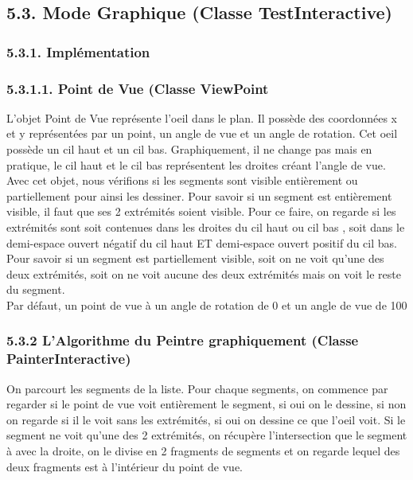 \documentclass[a4paper,12pt]{report}	%
\begin{document}
	{\subsection*{5.3. Mode Graphique (Classe TestInteractive)}}
	
    {\subsubsection*{5.3.1. Implémentation}}
	
	{\subsubsection*{5.3.1.1. Point de Vue (Classe ViewPoint}}
	L'objet Point de Vue représente l'oeil dans le plan. Il possède des coordonnées x et y représentées par un point, un angle de vue et un angle de rotation. Cet oeil possède un cil haut et un cil bas. Graphiquement, il ne change pas mais en pratique, le cil haut et le cil bas représentent les droites créant l'angle de vue.\\
\indent Avec cet objet, nous vérifions si les segments sont visible entièrement ou partiellement pour ainsi les dessiner. Pour savoir si un segment est entièrement visible, il faut que ses 2 extrémités soient visible. Pour ce faire, on regarde si les extrémités sont soit contenues dans les droites du cil haut ou cil bas , soit dans le demi-espace ouvert négatif du cil haut ET demi-espace ouvert positif du cil bas.\\
\indent Pour savoir si un segment est partiellement visible, soit on ne voit qu'une des deux extrémités, soit on ne voit aucune des deux extrémités mais on voit le reste du segment.\\
\indent Par défaut, un point de vue à un angle de rotation de 0 et un angle de vue de 100\\
	
	   {\subsubsection*{5.3.2 L'Algorithme du Peintre graphiquement (Classe PainterInteractive)}}
    On parcourt les segments de la liste. Pour chaque segments, on commence par regarder si le point de vue voit entièrement le segment, si oui on le dessine, si non on regarde si il le voit sans les extrémités, si oui on dessine ce que l'oeil voit. Si le segment ne voit qu'une des 2 extrémités, on récupère l'intersection que le segment à avec la droite, on le divise en 2 fragments de segments et on regarde lequel des deux fragments est à l'intérieur du point de vue.\\
\indent 
	
\end{document}
